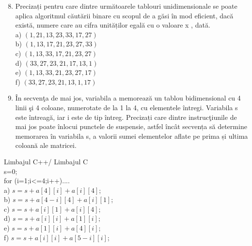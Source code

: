 \begin{enumerate}
  \setcounter{enumi}{7}
  \item Precizați pentru care dintre următoarele tablouri unidimensionale se poate aplica algoritmul căutării binare cu scopul de a găsi în mod eficient, dacă există, numere care au cifra unităților egală cu o valoare x , dată.\\
a) $(1,21,13,23,33,17,27)$\\
b) $(1,13,17,21,23,27,33)$\\
c) $(1,13,33,17,21,23,27)$\\
d) $(33,27,23,21,17,13,1)$\\
e) $(1,13,33,21,23,27,17)$\\
f) $(33,27,23,21,13,1,17)$
  \item În secvenţa de mai jos, variabila a memorează un tablou bidimensional cu 4 linii şi 4 coloane, numerotate de la 1 la 4, cu elementele întregi. Variabila s este întreagă, iar i este de tip întreg. Precizați care dintre instrucţiunile de mai jos poate înlocui punctele de suspensie, astfel încât secvența să determine memorarea în variabila s, a valorii sumei elementelor aflate pe prima și ultima coloană ale matricei.
\end{enumerate}

Limbajul C++/ Limbajul C\\
s=0;\\
for (i=1;i<=4;i++)....\\
a) $s=s+a[4][i]+a[i][4]$;\\
b) $s=s+a[4-i][4]+a[i][1]$;\\
c) $s=s+a[i][1]+a[i][4]$;\\
d) $s=s+a[i][i]+a[1][i] ;$\\
e) $s=s+a[1][i]+a[4][i]$;\\
f) $s=s+a[i][i]+a[5-i][i]$;

